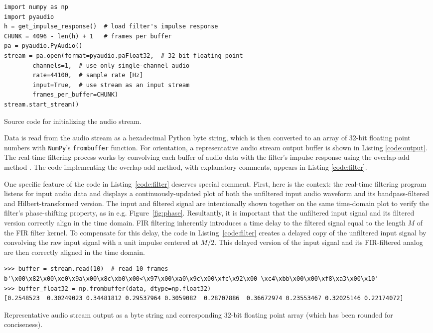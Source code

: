 \begin{listing}[htb!]
\begin{verbatim}
import numpy as np
import pyaudio
h = get_impulse_response()  # load filter's impulse response
CHUNK = 4096 - len(h) + 1   # frames per buffer
pa = pyaudio.PyAudio()
stream = pa.open(format=pyaudio.paFloat32,  # 32-bit floating point
        channels=1,  # use only single-channel audio
        rate=44100,  # sample rate [Hz]
        input=True,  # use stream as an input stream
        frames_per_buffer=CHUNK)
stream.start_stream()
\end{verbatim}
    \vspace{-1ex}
    \caption{Source code for initializing the audio stream.}
    \label{code:stream}
\end{listing}

Data is read from the audio stream as a hexadecimal Python byte string, which is then converted to an array of 32-bit floating point numbers with \texttt{NumPy}'s \texttt{frombuffer} function.
For orientation, a representative audio stream output buffer is shown in Listing \ref{code:output}.
The real-time filtering process works by convolving each buffer of audio data with the filter's impulse response using the overlap-add method \cite{convolution}.
The code implementing the overlap-add method, with explanatory comments, appears in Listing \ref{code:filter}.

One specific feature of the code in Listing~\ref{code:filter} deserves special comment.
First, here is the context: the real-time filtering program listens for input audio data and displays a continuously-updated plot of both the unfiltered input audio waveform and its bandpass-filtered and Hilbert-transformed version.
The input and filtered signal are intentionally shown together on the same time-domain plot to verify the filter's phase-shifting property, as in e.g. Figure~\ref{fig:phase}.
Resultantly, it is important that the unfiltered input signal and its filtered version correctly align in the time domain.
FIR filtering inherently introduces a time delay to the filtered signal equal to the length $ M $ of the FIR filter kernel.
To compensate for this delay, the code in Listing~\ref{code:filter} creates a delayed copy of the unfiltered input signal by convolving the raw input signal with a unit impulse centered at $ M / 2 $.
This delayed version of the input signal and its FIR-filtered analog are then correctly aligned in the time domain.

\begin{listing}
\begin{verbatim}
>>> buffer = stream.read(10)  # read 10 frames
b'\x00\x82\x00\xe0\x9a\x00\x8c\xb0\x00<\x97\x00\xa0\x9c\x00\xfc\x92\x00 \xc4\xbb\x00\x00\xf8\xa3\x00\x10'
>>> buffer_float32 = np.frombuffer(data, dtype=np.float32)
[0.2548523  0.30249023 0.34481812 0.29537964 0.3059082  0.28707886  0.36672974 0.23553467 0.32025146 0.22174072]
\end{verbatim}   
    \vspace{-1ex}
    \caption{Representative audio stream output as a byte string and corresponding 32-bit floating point array (which has been rounded for conciseness).}
    \label{code:output}
\end{listing}

